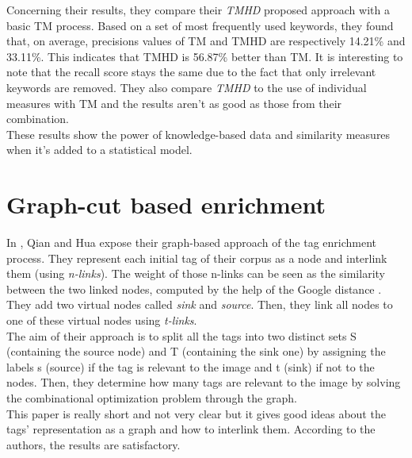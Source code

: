 Concerning their results, they compare their \emph{TMHD} proposed approach with a basic TM process. Based on a set of most frequently used keywords, they found that, on average, precisions values of TM and TMHD are respectively 14.21\% and 33.11\%. This indicates that TMHD is 56.87\% better than TM. It is interesting to note that the recall score stays the same due to the fact that only irrelevant keywords are removed. They also compare \emph{TMHD} to the use of individual measures with TM and the results aren't as good as those from their combination.\\
These results show the power of knowledge-based data and similarity measures when it's added to a statistical model.

\section{Graph-cut based enrichment} %
\label{sec:graph_cut_based_enrichment}
In \cite{qian2011graph}, Qian and Hua expose their graph-based approach of the tag enrichment process. They represent each initial tag of their corpus as a node and interlink them (using \emph{n-links}). The weight of those n-links can be seen as the similarity between the two linked nodes, computed by the help of the Google distance \cite{cilibrasi2007google}. They add two virtual nodes called \emph{sink} and \emph{source}. Then, they link all nodes to one of these virtual nodes using \emph{t-links}.\\

The aim of their approach is to split all the tags into two distinct sets S (containing the source node) and T (containing the sink one) by assigning the labels s (source) if the tag is relevant to the image and t (sink) if not to the nodes. Then, they determine how many tags are relevant to the image by solving the combinational optimization problem through the graph.\\

This paper is really short and not very clear but it gives good ideas about the tags' representation as a graph and how to interlink them. According to the authors, the results are satisfactory.   

